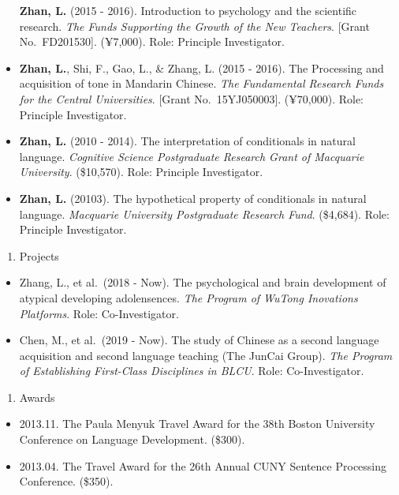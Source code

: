 \documentclass[12pt,]{article}
\providecommand{\tightlist}{%
  \setlength{\itemsep}{0pt}\setlength{\parskip}{0pt}}
\begin{document}
\begin{itemize}
  \textbf{Zhan, L.} (2015 - 2016). Introduction to psychology and the
  scientific research. \emph{The Funds Supporting the Growth of the New
  Teachers}. {[}Grant No.~FD201530{]}. (¥7,000). Role: Principle
  Investigator.
\item
  \textbf{Zhan, L.}, Shi, F., Gao, L., \& Zhang, L. (2015 - 2016). The
  Processing and acquisition of tone in Mandarin Chinese. \emph{The
  Fundamental Research Funds for the Central Universities}. {[}Grant
  No.~15YJ050003{]}. (¥70,000). Role: Principle Investigator.
\item
  \textbf{Zhan, L.} (2010 - 2014). The interpretation of conditionals in
  natural language. \emph{Cognitive Science Postgraduate Research Grant
  of Macquarie University}. (\$10,570). Role: Principle Investigator.
\item
  \textbf{Zhan, L.} (20103). The hypothetical property of conditionals
  in natural language. \emph{Macquarie University Postgraduate Research
  Fund}. (\$4,684). Role: Principle Investigator.
\end{itemize}

\begin{enumerate}
\def\labelenumi{\arabic{enumi}.}
\setcounter{enumi}{1}
\tightlist
\item
  Projects
\end{enumerate}

\begin{itemize}
\item
  Zhang, L., et al.~(2018 - Now). The psychological and brain
  development of atypical developing adolensences. \emph{The Program of
  WuTong Inovations Platforms}. Role: Co-Investigator.
\item
  Chen, M., et al.~(2019 - Now). The study of Chinese as a second
  language acquisition and second language teaching (The JunCai Group).
  \emph{The Program of Establishing First-Class Disciplines in BLCU}.
  Role: Co-Investigator.
\end{itemize}

\begin{enumerate}
\def\labelenumi{\arabic{enumi}.}
\setcounter{enumi}{2}
\tightlist
\item
  Awards
\end{enumerate}

\begin{itemize}
\item
  2013.11. The Paula Menyuk Travel Award for the 38th Boston University
  Conference on Language Development. (\$300).
\item
  2013.04. The Travel Award for the 26th Annual CUNY Sentence Processing
  Conference. (\$350).
\end{itemize}
\end{document}
